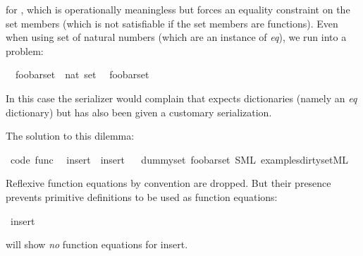 \begin{isabellebody}
\begin{isamarkuptext}
  for , which is operationally meaningless
  but forces an equality constraint on the set members
  (which is not satisfiable if the set members are functions).
  Even when using set of natural numbers (which are an instance
  of \emph{eq}), we run into a problem:%
\end{isamarkuptext}%
\isamarkuptrue%
\isamarkupfalse%
\isanewline
\ \ foobar{\isacharunderscore}set\ {\isacharcolon}{\isacharcolon}\ {\isachardoublequoteopen}nat\ set{\isachardoublequoteclose}\isanewline
\ \ {\isachardoublequoteopen}foobar{\isacharunderscore}set\ {\isacharequal}\ {\isacharbraceleft}{}{\isacharcomma}\ {}{\isacharcomma}\ {}{\isacharbraceright}{\isachardoublequoteclose}%
\begin{isamarkuptext}%
In this case the serializer would complain that 
  expects dictionaries (namely an \emph{eq} dictionary) but
  has also been given a customary serialization.

  The solution to this dilemma:%
\end{isamarkuptext}%
\isamarkuptrue%
\isamarkupfalse%
\ {\isacharbrackleft}code\ func{\isacharbrackright}{\isacharcolon}\isanewline
\ \ {\isachardoublequoteopen}insert\ {\isacharequal}\ insert{\isachardoublequoteclose}%
\isadelimproof
\ %
\endisadelimproof
%
\isatagproof
\isacommand{{\isachardot}{\isachardot}}\isamarkupfalse%
%
\endisatagproof
{\isafoldproof}%
%
\isadelimproof
%
\endisadelimproof
\isanewline
\isanewline
{}\isamarkupfalse%
\ dummy{\isacharunderscore}set\ foobar{\isacharunderscore}set\ {\isacharparenleft}SML\ {\isachardoublequoteopen}examples{\isacharslash}dirty{\isacharunderscore}set{\isachardot}ML{\isachardoublequoteclose}{\isacharparenright}%
\begin{isamarkuptext}%

  Reflexive function equations by convention are dropped.
  But their presence prevents primitive definitions to be
  used as function equations:%
\end{isamarkuptext}%
\isamarkuptrue%
\isamarkupfalse%
\ {\isacharparenleft}insert{\isacharparenright}%
\begin{isamarkuptext}%
will show \emph{no} function equations for insert.


\end{isamarkuptext}
\end{isabellebody}
